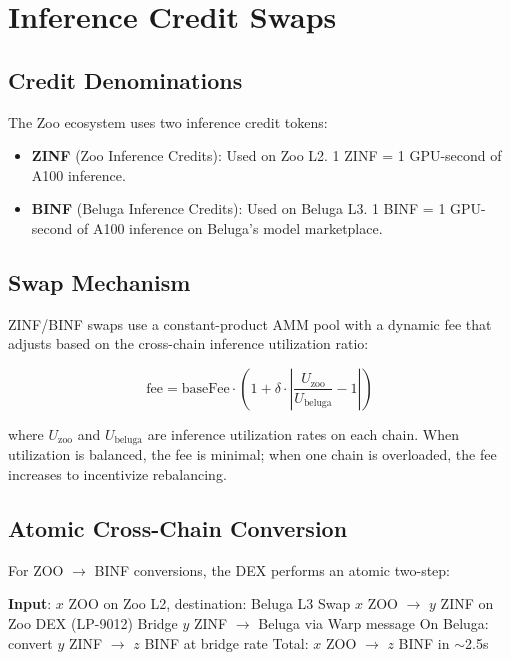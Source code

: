 \section{Inference Credit Swaps}

\label{sec:credits}

\subsection{Credit Denominations}

The Zoo ecosystem uses two inference credit tokens:

\begin{itemize}
    \item \textbf{ZINF} (Zoo Inference Credits): Used on Zoo L2. 1 ZINF = 1 GPU-second of A100 inference.
    \item \textbf{BINF} (Beluga Inference Credits): Used on Beluga L3. 1 BINF = 1 GPU-second of A100 inference on Beluga's model marketplace.
\end{itemize}

\subsection{Swap Mechanism}

ZINF/BINF swaps use a constant-product AMM pool with a dynamic fee that adjusts based on the cross-chain inference utilization ratio:

\begin{equation}
\text{fee} = \text{baseFee} \cdot \left(1 + \delta \cdot \left|\frac{U_{\text{zoo}}}{U_{\text{beluga}}} - 1\right|\right)
\end{equation}

where $U_{\text{zoo}}$ and $U_{\text{beluga}}$ are inference utilization rates on each chain. When utilization is balanced, the fee is minimal; when one chain is overloaded, the fee increases to incentivize rebalancing.

\subsection{Atomic Cross-Chain Conversion}

For ZOO $\to$ BINF conversions, the DEX performs an atomic two-step:

\begin{algorithm}[t]
\caption{Atomic Inference Credit Conversion}
\label{alg:credits}
\begin{algorithmic}[1]
\STATE \textbf{Input}: $x$ ZOO on Zoo L2, destination: Beluga L3
\STATE Swap $x$ ZOO $\to$ $y$ ZINF on Zoo DEX (LP-9012)
\STATE Bridge $y$ ZINF $\to$ Beluga via Warp message
\STATE On Beluga: convert $y$ ZINF $\to$ $z$ BINF at bridge rate
\STATE Total: $x$ ZOO $\to$ $z$ BINF in $\sim$2.5s
\end{algorithmic}
\end{algorithm}

